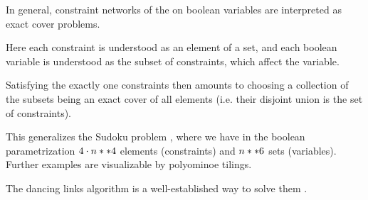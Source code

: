 \begin{example}

    In general, constraint networks of the \eoconword on boolean variables are interpreted as exact cover problems.

    Here each constraint is understood as an element of a set, and each boolean variable is understood as the subset of constraints, which affect the variable.

    Satisfying the exactly one constraints then amounts to choosing a collection of the subsets being an exact cover of all elements (i.e. their disjoint union is the set of constraints).

    This generalizes the Sudoku problem , where we have in the boolean parametrization $4\cdot n**4$ elements (constraints) and $n**6$ sets (variables).
    Further examples are visualizable by polyominoe tilings.
    
    The dancing links algorithm is a well-established way to solve them \cite{knuth_art_2022}.

\end{example}